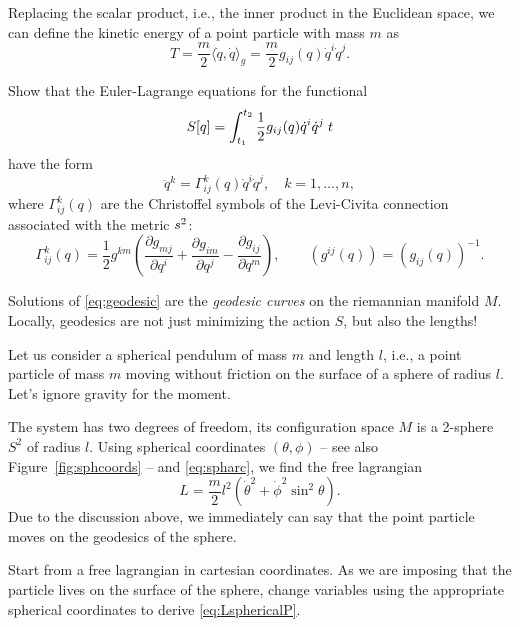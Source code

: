 \documentclass[english,fontsize=11pt,paper=a5,oneside]{scrbook}
\newcommand{\lag}{\langle}
\newcommand{\rag}{\rangle}
\let\d\relax
\DeclareMathOperator{\d}{d}
\theoremstyle{definition}
\newenvironment{example}
  {\pushQED{\qed}\renewcommand{\qedsymbol}{$\lozenge$}\examplex}
  {\popQED\endexamplex}
\newenvironment{exercise}
  {\pushQED{\qed}\renewcommand{\qedsymbol}{$\maltese$}\exercisex}
  {\popQED\endexercisex}
\begin{document}
Replacing the scalar product, i.e., the inner product in the Euclidean space, we can define the kinetic energy of a point particle with mass $m$ as
\begin{equation}
    T = \frac m2 \lag\dot q, \dot q\rag_g = \frac{m}2 g_{ij}(q)\dot q^i\dot q^j.
\end{equation}

\begin{exercise}\label{exe:geodesic1}
    Show that the Euler-Lagrange equations for the functional
    \begin{equation}
        S[q] = \int_{t_1}^{t_2} \frac 12 g_{ij}(q) \dot q^i \dot q^j\; \d t
    \end{equation}
    have the form
    \begin{equation}\label{eq:geodesic}
        \ddot q^k = \Gamma_{ij}^k(q) \dot q^i \dot q^j, \quad k=1,\ldots, n,
    \end{equation}
    where $\Gamma_{ij}^k(q)$ are the Christoffel symbols of the Levi-Civita connection associated with the metric $\d s^2$:
    \begin{equation}
        \Gamma_{ij}^k(q) = \frac12 g^{km}\left(
            \frac{\partial g_{mj}}{\partial q^i} + \frac{\partial g_{im}}{\partial q^j}-\frac{\partial g_{ij}}{\partial q^m}
            \right),
        \qquad (g^{ij}(q)) = (g_{ij}(q))^{-1}.
    \end{equation}
\end{exercise}

Solutions of \eqref{eq:geodesic} are the \emph{geodesic curves} on the riemannian manifold $M$. Locally, geodesics are not just minimizing the action $S$, but also the lengths!

\begin{example}\label{ex:sphericalP}
    Let us consider a spherical pendulum of mass $m$ and length $l$, i.e., a point particle of mass $m$ moving without friction on the surface of a sphere of radius $l$.
    Let's ignore gravity for the moment.
    
    The system has two degrees of freedom, its configuration space $M$ is a 2-sphere $S^2$ of radius $l$.
    Using spherical coordinates $(\theta, \phi)$ -- see also Figure~\ref{fig:sphcoords} -- and \eqref{eq:spharc}, we find the free lagrangian
    \begin{equation}\label{eq:LsphericalP}
        L = \frac m2 l^2(\dot \theta^2 + \dot \phi^2 \sin^2\theta).
    \end{equation}
    Due to the discussion above, we immediately can say that the point particle moves on the geodesics of the sphere.

    \begin{exercise}
        Start from a free lagrangian in cartesian coordinates.
        As we are imposing that the particle lives on the surface of the sphere, change variables using the appropriate spherical coordinates to derive \eqref{eq:LsphericalP}.
    \end{exercise}
\end{example}
\end{document}
